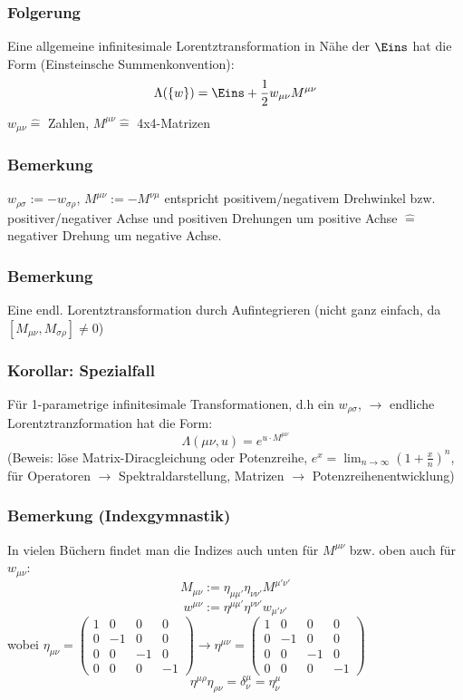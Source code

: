 \documentclass[twoside,a4paper]{scrartcl}
\renewcommand{\1}{\mathds{1}}
\newcommand{\ra}{\rightarrow}
\newcommand{\entspricht}{\mathrel{\widehat{=}}}
\renewcommand{\L}{\Lambda}
\begin{document}
\subsubsection*{Folgerung}
Eine allgemeine infinitesimale Lorentztransformation in Nähe der $\Eins$ hat die Form (Einsteinsche Summenkonvention):
$$\L(\{w\})=\Eins+\frac{1}{2} w_{\mu\nu}M^{\mu\nu}$$
$w_{\mu\nu}\entspricht$ Zahlen, $M^{\mu\nu}\entspricht$ 4x4-Matrizen
\subsubsection*{Bemerkung}
$w_{\rho\sigma}:=-w_{\sigma\rho}$, $M^{\mu\nu}:=-M^{\nu\mu}$ entspricht positivem/negativem Drehwinkel bzw. positiver/negativer Achse und positiven Drehungen um positive Achse $\entspricht$ negativer Drehung um negative Achse.
\subsubsection*{Bemerkung}
Eine endl. Lorentztransformation durch Aufintegrieren (nicht ganz einfach, da $[M_{\mu\nu},M_{\sigma\rho}]\neq 0$)
\subsubsection*{Korollar: Spezialfall}
Für 1-parametrige infinitesimale Transformationen, d.h ein $w_{\rho\sigma}$, $\ra$ endliche Lorentztranzformation hat die Form:
$$\L(\mu\nu,u)=e^{u \cdot M^{\mu\nu}}$$
(Beweis: löse Matrix-Diracgleichung oder Potenzreihe, $e^x=\lim_{n \ra \infty} (1+\frac{x}{n})^n$, für Operatoren $\ra$ Spektraldarstellung, Matrizen $\ra$ Potenzreihenentwicklung)
\subsubsection*{Bemerkung (Indexgymnastik)}
In vielen Büchern findet man die Indizes auch unten für $M^{\mu\nu}$ bzw. oben auch für $w_{\mu\nu}$:
$$M_{\mu\nu}:=\eta_{\mu\mu'}\eta_{\nu\nu'}M^{\mu'\nu'}$$
$$w^{\mu\nu}:=\eta^{\mu\mu'}\eta^{\nu\nu'}w_{\mu'\nu'}$$
wobei $\eta_{\mu\nu}=\begin{pmatrix}1 & 0& 0& 0 \\ 0 & -1 & 0& 0 \\ 0 & 0& -1 & 0 \\ 0& 0& 0& -1\end{pmatrix} \ra \eta^{\mu\nu}=\begin{pmatrix}1 & 0& 0& 0 \\ 0 & -1 & 0& 0 \\ 0 & 0& -1 & 0 \\ 0& 0& 0& -1\end{pmatrix}$
$$\eta^{\mu\rho}\eta_{\rho\nu}=\delta_\nu^\mu= \eta_\nu^\mu$$
\end{document}
